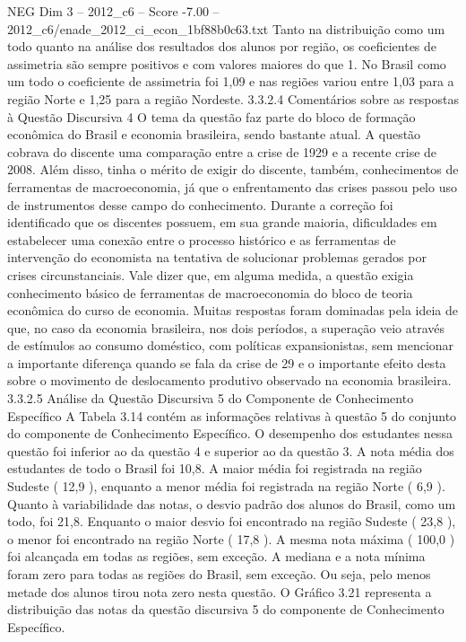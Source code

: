 \begin{textsample}{NEG Dim 3 – 2012\_c6 – Score -7.00 – 2012\_c6/enade\_2012\_ci\_econ\_1bf88b0c63.txt}
Tanto na distribuição como um todo quanto na análise dos resultados dos alunos por região, os coeficientes de assimetria são sempre positivos e com valores maiores do que 1.
No Brasil como um todo o coeficiente de assimetria foi 1,09 e nas regiões variou entre 1,03 para a região Norte e 1,25 para a região Nordeste. 3.3.2.4 Comentários sobre as respostas à Questão Discursiva 4 O tema da questão faz parte do bloco de formação econômica do Brasil e economia brasileira, sendo bastante atual.
A questão cobrava do discente uma comparação entre a crise de 1929 e a recente crise de 2008.
Além disso, tinha o mérito de exigir do discente, também, conhecimentos de ferramentas de macroeconomia, já que o enfrentamento das crises passou pelo uso de instrumentos desse campo do conhecimento.
Durante a correção foi identificado que os discentes possuem, em sua grande maioria, dificuldades em estabelecer uma conexão entre o processo histórico e as ferramentas de intervenção do economista na tentativa de solucionar problemas gerados por crises circunstanciais.
Vale dizer que, em alguma medida, a questão exigia conhecimento básico de ferramentas de macroeconomia do bloco de teoria econômica do curso de economia.
Muitas respostas foram dominadas pela ideia de que, no caso da economia brasileira, nos dois períodos, a superação veio através de estímulos ao consumo doméstico, com políticas expansionistas, sem mencionar a importante diferença quando se fala da crise de 29 e o importante efeito desta sobre o movimento de deslocamento produtivo observado na economia brasileira. 3.3.2.5 Análise da Questão Discursiva 5 do Componente de Conhecimento Específico A Tabela 3.14 contém as informações relativas à questão 5 do conjunto do componente de Conhecimento Específico.
O desempenho dos estudantes nessa questão foi inferior ao da questão 4 e superior ao da questão 3.
A nota média dos estudantes de todo o Brasil foi 10,8.
A maior média foi registrada na região Sudeste ( 12,9 ), enquanto a menor média foi registrada na região Norte ( 6,9 ).
Quanto à variabilidade das notas, o desvio padrão dos alunos do Brasil, como um todo, foi 21,8.
Enquanto o maior desvio foi encontrado na região Sudeste ( 23,8 ), o menor foi encontrado na região Norte ( 17,8 ).
A mesma nota máxima ( 100,0 ) foi alcançada em todas as regiões, sem exceção.
A mediana e a nota mínima foram zero para todas as regiões do Brasil, sem exceção.
Ou seja, pelo menos metade dos alunos tirou nota zero nesta questão.
O Gráfico 3.21 representa a distribuição das notas da questão discursiva 5 do componente de Conhecimento Específico.

\end{textsample}

